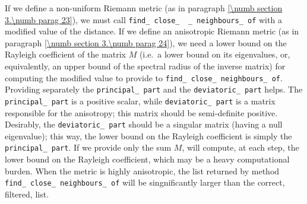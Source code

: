 If we define a non-uniform Riemann metric
(as in paragraph \ref{\numb section 3.\numb parag 23}),
we must call {\small\tt find\_\,close\_\, \_\,neighbours\_\,of} with a modified value of the
distance.
If we define an anisotropic Riemann metric
(as in paragraph \ref{\numb section 3.\numb parag 24}),
we need a lower bound on the Rayleigh coefficient of the matrix $M$ (i.e.\ a lower bound
on its eigenvalues, or, equivalently, an upper bound of the spectral radius of the inverse
matrix) for computing the modified value to provide to {\small\tt find\_\,close\_\,neighbours\_\,of}.
Providing separately the {\small\tt principal\_\,part} and the {\small\tt deviatoric\_\,part} helps.
The {\small\tt principal\_\,part} is a positive scalar, while {\small\tt deviatoric\_\,part} is
a matrix responsible for the anisotropy; this matrix should be semi-definite positive.
Desirably, the {\small\tt deviatoric\_\,part} should be a singular matrix (having a null eigenvalue);
this way, the lower bound on the Rayleigh coefficient is simply the {\small\tt principal\_\,part}.
If we provide only the sum $M$, {\maniFEM} will compute, at each step, the lower bound on the
Rayleigh coefficient, which may be a heavy computational burden.
When the metric is highly anisotropic, the list returned by method
{\small\tt find\_\,close\_\,neighbours\_\,of} will be singnificantly larger than the correct,
filtered, list.

